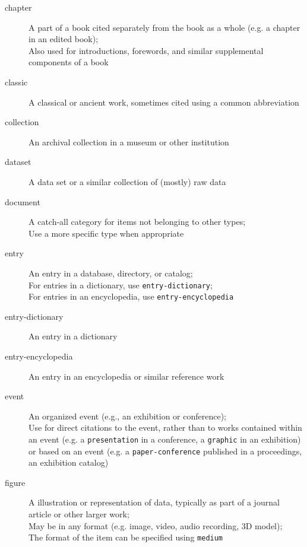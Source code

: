 \begin{description}
  \item[chapter]
    A part of a book cited separately from the book as a whole (e.g. a
    chapter in an edited book);\\
    Also used for introductions, forewords, and similar supplemental
    components of a book

  \item[classic]
    A classical or ancient work, sometimes cited using a common abbreviation

  \item[collection]
    An archival collection in a museum or other institution

  \item[dataset]
    A data set or a similar collection of (mostly) raw data

  \item[document]
    A catch-all category for items not belonging to other types;\\
    Use a more specific type when appropriate

  \item[entry]
    An entry in a database, directory, or catalog;\\
    For entries in a dictionary, use \texttt{entry-dictionary};\\
    For entries in an encyclopedia, use \texttt{entry-encyclopedia}

  \item[entry-dictionary]
    An entry in a dictionary

  \item[entry-encyclopedia]
    An entry in an encyclopedia or similar reference work

  \item[event]
    An organized event (e.g., an exhibition or conference);\\
    Use for direct citations to the event, rather than to works contained
    within an event (e.g. a \texttt{presentation} in a conference, a
    \texttt{graphic} in an exhibition) or based on an event (e.g. a
    \texttt{paper-conference} published in a proceedings, an exhibition
    catalog)

  \item[figure]
    A illustration or representation of data, typically as part of a journal
    article or other larger work;\\
    May be in any format (e.g. image, video, audio recording, 3D model);\\
    The format of the item can be specified using \texttt{medium}


\end{description}

